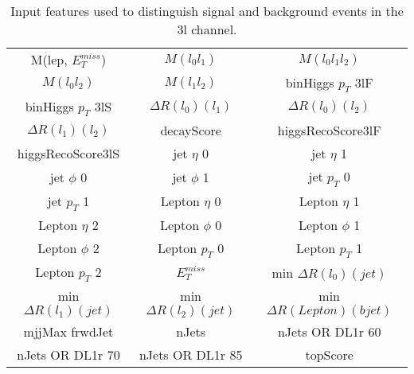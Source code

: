 \begin{table}[H]
  \begin{center}
  \begin{tabular}{ccc}
    \hline
    M(lep, $E_T^{miss}$) & $M(l_0l_1)$ & $M(l_0l_1l_2)$ \\
    $M(l_0l_2)$ & $M(l_1l_2)$ & binHiggs $p_T$ 3lF \\
    binHiggs $p_T$ 3lS & $\Delta R(l_0)(l_1)$ & $\Delta R(l_0)(l_2)$ \\
    $\Delta R(l_1)(l_2)$ & decayScore & higgsRecoScore3lF \\
    higgsRecoScore3lS & jet  $\eta$ 0 & jet  $\eta$ 1 \\
    jet $\phi$ 0 & jet $\phi$ 1 & jet  $p_T$ 0 \\
    jet  $p_T$ 1 & Lepton  $\eta$ 0 & Lepton  $\eta$ 1 \\
    Lepton  $\eta$ 2 & Lepton $\phi$ 0 & Lepton $\phi$ 1 \\
    Lepton $\phi$ 2 & Lepton  $p_T$ 0 & Lepton  $p_T$ 1 \\
    Lepton  $p_T$ 2 & $E_T^{miss}$ & min $\Delta R(l_0)(jet)$ \\
    min $\Delta R(l_1)(jet)$ & min $\Delta R(l_2)(jet)$ & min $\Delta R(Lepton)(bjet)$ \\
    mjjMax frwdJet & nJets & nJets OR DL1r 60 \\
    nJets OR DL1r 70 & nJets OR DL1r 85 & topScore   \\
    \hline
  \end{tabular}
  \end{center}
  \caption{Input features used to distinguish signal and background events in the 3l channel.}
  \label{tab:sigBkg3lfeatures}
\end{table}
